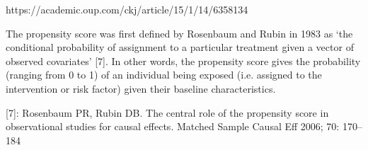 https://academic.oup.com/ckj/article/15/1/14/6358134

The propensity score was first defined by Rosenbaum and Rubin in 1983 as ‘the conditional probability of assignment to a particular treatment given a vector of observed covariates’ [7]. In other words, the propensity score gives the probability (ranging from 0 to 1) of an individual being exposed (i.e. assigned to the intervention or risk factor) given their baseline characteristics. 

[7]: Rosenbaum   PR, Rubin   DB.  The central role of the propensity score in observational studies for causal effects. Matched Sample Causal Eff  2006; 70: 170–184
